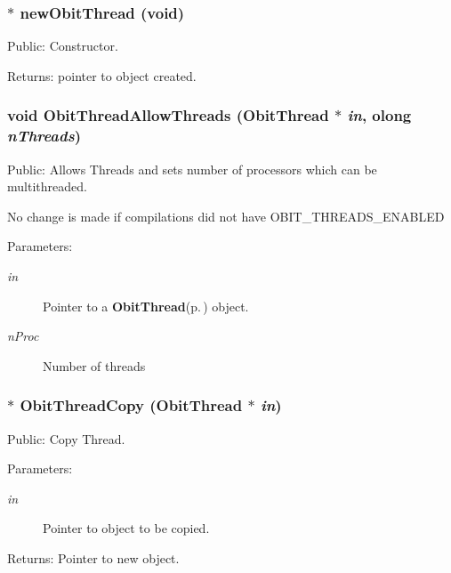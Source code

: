 \subsubsection{$\ast$ new\-Obit\-Thread (void)}\label{ObitThread_8h_a1}


Public: Constructor. 

\begin{Desc}
\item[Returns:]pointer to object created. \end{Desc}
\subsubsection{\setlength{\rightskip}{0pt plus 5cm}void Obit\-Thread\-Allow\-Threads ({\bf Obit\-Thread} $\ast$ {\em in}, {\bf olong} {\em n\-Threads})}\label{ObitThread_8h_a19}


Public: Allows Threads and sets number of processors which can be multithreaded. 

No change is made if compilations did not have OBIT\_\-THREADS\_\-ENABLED \begin{Desc}
\item[Parameters:]
\begin{description}
\item[{\em in}]Pointer to a {\bf Obit\-Thread}{\rm (p.\,\pageref{structObitThread})} object. \item[{\em n\-Proc}]Number of threads \end{description}
\end{Desc}
\subsubsection{$\ast$ Obit\-Thread\-Copy ({\bf Obit\-Thread} $\ast$ {\em in})}\label{ObitThread_8h_a3}


Public: Copy Thread. 

\begin{Desc}
\item[Parameters:]
\begin{description}
\item[{\em in}]Pointer to object to be copied. \end{description}
\end{Desc}
\begin{Desc}
\item[Returns:]Pointer to new object. \end{Desc}
